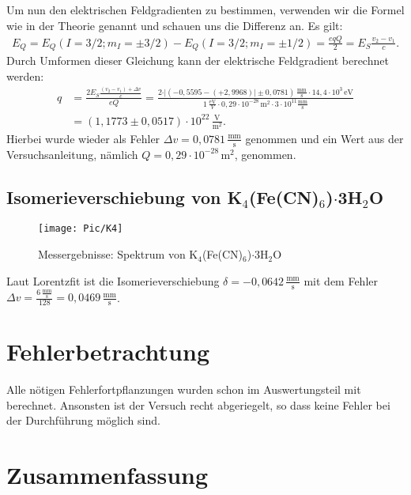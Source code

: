 \documentclass[10pt,twoside]{article}
\renewcommand{\1}{^{-1}}
\renewcommand{\2}{^{-2}}
\newcommand{\3}{^{-3}}
\newcommand{\4}{^{-4}}
\newcommand{\5}{^{-5}}
\newcommand{\6}{^{-6}}
\newcommand{\7}{^{-7}}
\newcommand{\8}{^{-8}}
\newcommand{\9}{^{-9}}
\begin{document}
Um nun den elektrischen Feldgradienten zu bestimmen, verwenden wir die Formel wie in der Theorie genannt und schauen uns die Differenz an. Es gilt:
\begin{align*}
{E}_{{Q}} = E_Q(I=3/2; m_I=\pm 3/2)- E_Q(I=3/2; m_I=\pm 1/2) = \frac{eqQ}{2} = {E}_{{S}}\frac{v_2-v_1}{c}.
\end{align*}
Durch Umformen dieser Gleichung kann der elektrische Feldgradient berechnet werden:
\begin{align*}
q&=\frac{2{E}_{{S}}\frac{(v_2-v_1)+\Delta v}{c}}{eQ} = \frac{2 \cdot \vert (-0,5595-(+2,9968)\vert \pm 0,0781)\,\frac{\text{mm}}{\text{s}}\cdot 14,4\cdot10^3\,\text{eV}}{1\,\frac{\text{eV}}{V}\cdot 0,29\cdot 10 ^{-28}\,\text{m}^2\cdot  3\cdot 10^{11}\frac{\text{mm}}{\text{s}} } \\ &= (1,1773\pm 0,0517) \cdot 10^{22}\,\frac{\text{V}}{\text{m}^2}.
\end{align*}
Hierbei wurde wieder als Fehler $\Delta v =0,0781\,\frac{\text{mm}}{\text{s}}$ genommen und ein Wert aus der Versuchsanleitung, nämlich $Q=0,29\cdot 10 ^{-28}\,\text{m}^2$, genommen.

\subsection{Isomerieverschiebung von K$_4$(Fe(CN)$_6$)$\cdot$3H$_2$O }

\begin{figure}[H]
\centering
\texttt{[image: Pic/K4]}
\caption{Messergebnisse: Spektrum von K$_4$(Fe(CN)$_6$)$\cdot$3H$_2$O}
\label{K4}
\end{figure}

Laut Lorentzfit ist die Isomerieverschiebung $\delta=-0,0642\,\frac{\text{mm}}{\text{s}}$ mit dem Fehler $\Delta v= \frac{6\,\frac{\text{mm}}{\text{s}}}{128}=0,0469\,\frac{\text{mm}}{\text{s}}$.



\section{Fehlerbetrachtung}

Alle nötigen Fehlerfortpflanzungen wurden schon im Auswertungsteil mit berechnet. Ansonsten ist der Versuch recht abgeriegelt, so dass keine Fehler bei der Durchführung möglich sind.

\section{Zusammenfassung}
\end{document}
